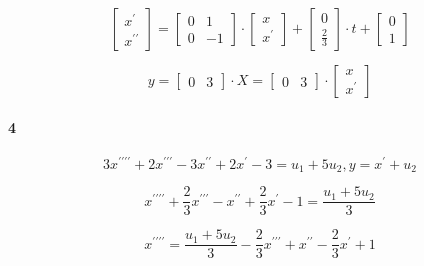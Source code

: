 \documentclass{article}
\begin{document}
    $$\begin{bmatrix}
            x^\prime\\
            x^{\prime\prime}
        \end{bmatrix} = 
        \begin{bmatrix}
            0 & 1\\
            0 & -1
        \end{bmatrix} \cdot
        \begin{bmatrix}
            x\\
            x^\prime
        \end{bmatrix} + 
        \begin{bmatrix}
            0\\
            \frac{2}{3}
        \end{bmatrix} \cdot t + 
        \begin{bmatrix}
            0\\
            1
        \end{bmatrix}$$ 
        
        $$y = 
        \begin{bmatrix}
            0 & 3
        \end{bmatrix} \cdot X = 
        \begin{bmatrix}
            0 & 3
        \end{bmatrix} \cdot
        \begin{bmatrix}
            x\\
            x^\prime
        \end{bmatrix}$$
        
    \paragraph{4}
     
     $$3x^{\prime\prime\prime\prime} + 2x^{\prime\prime\prime} - 3x^{\prime\prime} + 2x^{\prime} -3 = u_1 + 5u_2, y = x^{\prime} + u_2$$
    
     $$x^{\prime\prime\prime\prime} + \frac{2}{3}x^{\prime\prime\prime} - x^{\prime\prime} + \frac{2}{3}x^{\prime} - 1 = \frac{u_1 + 5u_2}{3}$$
     
     $$x^{\prime\prime\prime\prime} = \frac{u_1 + 5u_2}{3} - \frac{2}{3}x^{\prime\prime\prime} + x^{\prime\prime} - \frac{2}{3}x^{\prime} + 1 $$
     
\end{document}
